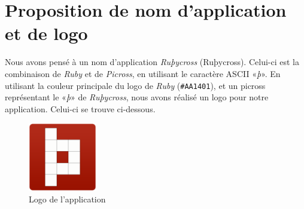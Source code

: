 \documentclass{report}
\begin{document}
	\section{Proposition de nom d'application et de logo}
	Nous avons pensé à un nom d'application \textit{Ruþycross} (Ruþycross). Celui-ci est la combinaison de \textit{Ruby} et de \textit{Picross}, en utilisant le caractère ASCII «\textit{þ}». En utilisant la couleur principale du logo de \textit{Ruby} (\texttt{\textcolor{rubycolor}{\#AA1401}}), et un picross représentant le «\textit{þ}» de \textit{Ruþycross}, nous avons réalisé un logo pour notre application. Celui-ci se trouve ci-dessous.
	\begin{figure}[H]
		\centering
		\includegraphics[width=3cm]{application_logo.png}
		\caption{Logo de l'application}
	\end{figure}
\end{document}

